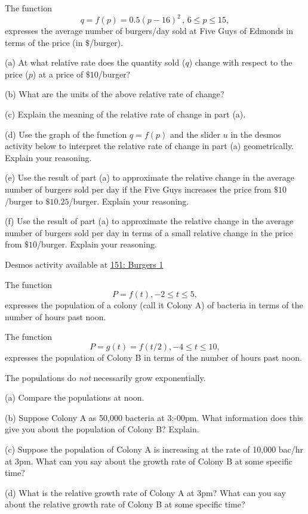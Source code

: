 \documentclass{ximera}
\begin{document}
\begin{question}  \label{Qe5r54tggrgtre}
The function 
\[
    q = f(p) = 0.5(p-16)^2 \, , \, 6\leq p \leq 15 , 
\]
expresses the average number of burgers/day sold at Five Guys of Edmonds in terms of the price (in $\$$/burger).

(a) At what relative rate does the quantity sold ($q$) change with respect to the price ($p$) at a price of $\$10$/burger?

(b) What are the units of the above relative rate of change?

(c) Explain the meaning of the relative rate of change in part (a).

(d) Use the graph of the function $q=f(p)$ and the slider $u$ in the desmos activity below to interpret the relative rate of change in part (a) geometrically. Explain your reasoning.

(e) Use the result of part (a) to approximate the relative change in the average number of burgers sold per day if the Five Guys increases the price from $\$10$/burger to $\$10.25$/burger. Explain your reasoning.

(f) Use the result of part (a) to approximate the relative change in the average number of burgers sold per day in terms of a small relative change in the price from $\$10$/burger. Explain your reasoning.


\begin{onlineOnly}
    \begin{center}
\end{center}
\end{onlineOnly}


Desmos activity available at \href{https://www.desmos.com/calculator/ylgk03oaza}{151: Burgers 1}

\end{question}

\begin{question}  \label{Qdsfsadfghbhhhhyy}
The function
\[
        P = f(t) , -2 \leq t \leq 5,
\]
expresses the population of a colony (call it Colony A) of bacteria in terms of the number of hours past noon.

The function 
\[
          P =g(t) = f(t/2), -4 \leq t \leq 10,
\]
expresses the population of Colony B in terms of the number of hours past noon.

The populations do \emph{not} necessarily grow exponentially.


(a) Compare the populations at noon.

(b) Suppose Colony A as 50,000 bacteria at 3:-00pm. What information does this give you about the population of Colony B? Explain.

(c) Suppose the population of Colony A is increasing at the rate of 10,000 bac/hr at 3pm. What can you say about the growth rate of Colony B at some specific time? 

(d) What is the relative growth rate of Colony A at 3pm? What can you say about the relative growth rate of Colony B at some specific time? 


\end{question}
\end{document}
